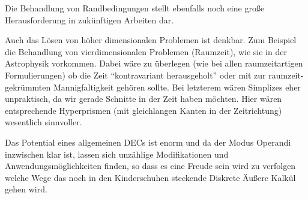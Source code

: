Die Behandlung von Randbedingungen stellt ebenfalls noch eine große Herausforderung in zukünftigen Arbeiten dar.

Auch das Lösen von höher dimensionalen Problemen ist denkbar.
Zum Beispiel die Behandlung von vierdimensionalen Problemen (Raumzeit), wie sie in der Astrophysik vorkommen.
Dabei wäre zu überlegen (wie bei allen raumzeitartigen Formulierungen) ob die Zeit "`kontravariant herausgeholt"' 
oder mit zur raumzeit-gekrümmten Mannigfaltigkeit gehören sollte. 
Bei letzterem wären Simplizes eher unpraktisch, da wir gerade Schnitte in der Zeit haben möchten. 
Hier wären entsprechende Hyperprismen (mit gleichlangen Kanten in der Zeitrichtung) wesentlich sinnvoller.

Das Potential eines allgemeinen DECs ist enorm und da der Modus Operandi inzwischen klar ist, lassen sich unzählige Modifikationen und
Anwendungsmöglichkeiten finden, so dass es eine Freude sein wird zu verfolgen welche Wege das noch in den Kinderschuhen steckende Diskrete
Äußere Kalkül gehen wird.
